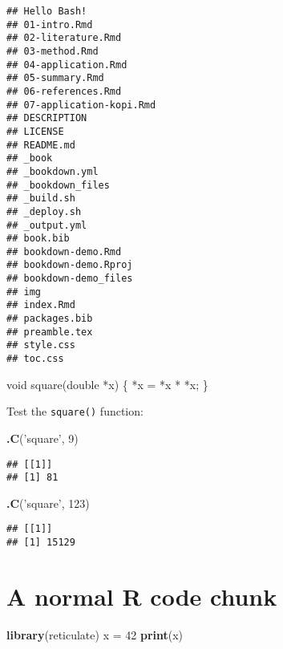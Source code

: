 \documentclass[]{book}
\newenvironment{Shaded}{\begin{snugshade}}{\end{snugshade}}
\newcommand{\DataTypeTok}[1]{\textcolor[rgb]{0.13,0.29,0.53}{#1}}
\newcommand{\DecValTok}[1]{\textcolor[rgb]{0.00,0.00,0.81}{#1}}
\newcommand{\KeywordTok}[1]{\textcolor[rgb]{0.13,0.29,0.53}{\textbf{#1}}}
\newcommand{\NormalTok}[1]{#1}
\newcommand{\StringTok}[1]{\textcolor[rgb]{0.31,0.60,0.02}{#1}}
\theoremstyle{definition}
\theoremstyle{definition}
\theoremstyle{definition}
\theoremstyle{remark}
\begin{document}
\begin{verbatim}
## Hello Bash!
## 01-intro.Rmd
## 02-literature.Rmd
## 03-method.Rmd
## 04-application.Rmd
## 05-summary.Rmd
## 06-references.Rmd
## 07-application-kopi.Rmd
## DESCRIPTION
## LICENSE
## README.md
## _book
## _bookdown.yml
## _bookdown_files
## _build.sh
## _deploy.sh
## _output.yml
## book.bib
## bookdown-demo.Rmd
## bookdown-demo.Rproj
## bookdown-demo_files
## img
## index.Rmd
## packages.bib
## preamble.tex
## style.css
## toc.css
\end{verbatim}

\begin{Shaded}
\begin{Highlighting}[]
\DataTypeTok{void}\NormalTok{ square(}\DataTypeTok{double}\NormalTok{ *x) \{}
\NormalTok{  *x = *x * *x;}
\NormalTok{\}}
\end{Highlighting}
\end{Shaded}

Test the \texttt{square()} function:

\begin{Shaded}
\begin{Highlighting}[]
\KeywordTok{.C}\NormalTok{(}\StringTok{'square'}\NormalTok{, }\DecValTok{9}\NormalTok{)}
\end{Highlighting}
\end{Shaded}

\begin{verbatim}
## [[1]]
## [1] 81
\end{verbatim}

\begin{Shaded}
\begin{Highlighting}[]
\KeywordTok{.C}\NormalTok{(}\StringTok{'square'}\NormalTok{, }\DecValTok{123}\NormalTok{)}
\end{Highlighting}
\end{Shaded}

\begin{verbatim}
## [[1]]
## [1] 15129
\end{verbatim}

\hypertarget{a-normal-r-code-chunk}{%
\section{A normal R code chunk}\label{a-normal-r-code-chunk}}

\begin{Shaded}
\begin{Highlighting}[]
\KeywordTok{library}\NormalTok{(reticulate)}
\NormalTok{x =}\StringTok{ }\DecValTok{42}
\KeywordTok{print}\NormalTok{(x)}
\end{Highlighting}
\end{Shaded}
\end{document}
